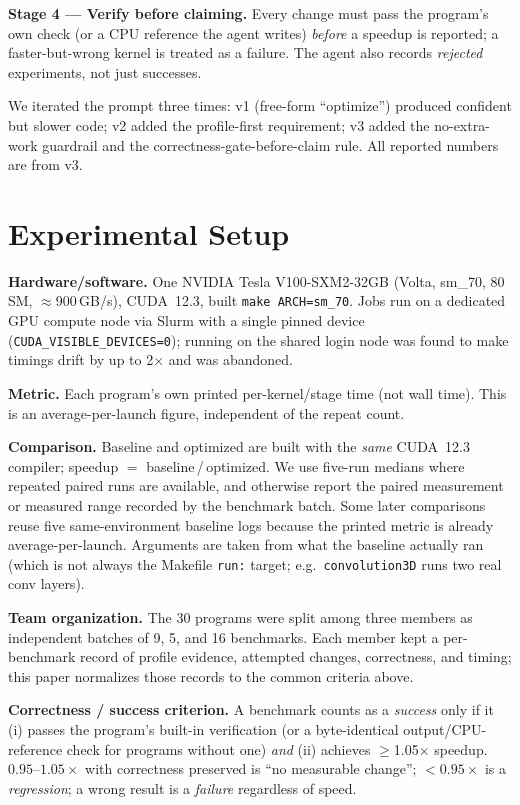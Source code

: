 \documentclass[conference]{IEEEtran}
\begin{document}
\textbf{Stage 4 --- Verify before claiming.} Every change must pass the program's
own check (or a CPU reference the agent writes) \emph{before} a speedup is
reported; a faster-but-wrong kernel is treated as a failure. The agent also
records \emph{rejected} experiments, not just successes.

We iterated the prompt three times: v1 (free-form ``optimize'') produced confident
but slower code; v2 added the profile-first requirement; v3 added the
no-extra-work guardrail and the correctness-gate-before-claim rule. All reported
numbers are from v3.

\section{Experimental Setup}
\label{sec:setup}
\textbf{Hardware/software.} One NVIDIA Tesla V100-SXM2-32GB (Volta, sm\_70, 80 SM,
$\approx$900\,GB/s), CUDA~12.3, built \texttt{make ARCH=sm\_70}. Jobs run on a
dedicated GPU compute node via Slurm with a single pinned device
(\texttt{CUDA\_VISIBLE\_DEVICES=0}); running on the shared login node was found to
make timings drift by up to 2$\times$ and was abandoned.

\textbf{Metric.} Each program's own printed per-kernel/stage time (not wall time).
This is an average-per-launch figure, independent of the repeat count.

\textbf{Comparison.} Baseline and optimized are built with the \emph{same}
CUDA~12.3 compiler; speedup $=$ baseline\,/\,optimized. We use five-run medians
where repeated paired runs are available, and otherwise report the paired
measurement or measured range recorded by the benchmark batch. Some later
comparisons reuse five same-environment baseline logs because the printed metric
is already average-per-launch. Arguments are taken from what the baseline
actually ran (which is not always the Makefile \texttt{run:} target; e.g.\
\texttt{convolution3D} runs two real conv layers).

\textbf{Team organization.} The 30 programs were split among three members as
independent batches of 9, 5, and 16 benchmarks. Each member kept a per-benchmark
record of profile evidence, attempted changes, correctness, and timing; this paper
normalizes those records to the common criteria above.

\textbf{Correctness / success criterion.} A benchmark counts as a \emph{success}
only if it (i) passes the program's built-in verification (or a byte-identical
output/CPU-reference check for programs without one) \emph{and} (ii) achieves
$\geq$1.05$\times$ speedup. $0.95$--$1.05\times$ with correctness preserved is
``no measurable change''; $<0.95\times$ is a \emph{regression}; a wrong result is
a \emph{failure} regardless of speed.
\end{document}
